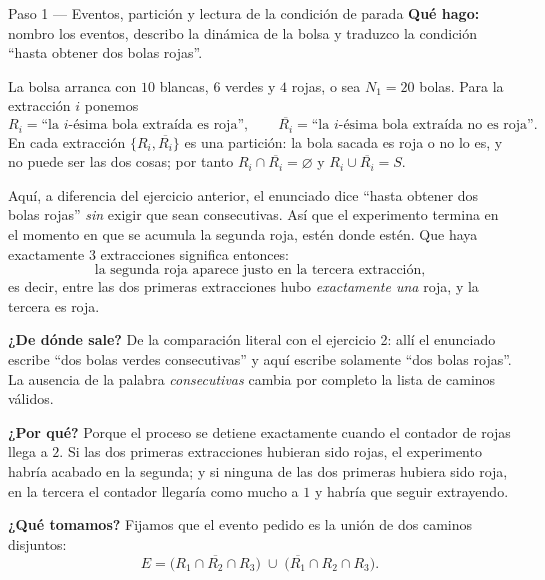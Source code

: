 \documentclass[11pt]{article}
\begin{document}
\begin{paso}{Paso 1 --- Eventos, partición y lectura de la condición de parada}
\textbf{Qué hago:} nombro los eventos, describo la dinámica de la bolsa y traduzco la condición ``hasta obtener dos bolas rojas''.

La bolsa arranca con $10$ blancas, $6$ verdes y $4$ rojas, o sea $N_1=20$ bolas. Para la extracción $i$ ponemos
\[
R_i=\text{``la $i$-ésima bola extraída es roja''},
\qquad
\overline{R_i}=\text{``la $i$-ésima bola extraída no es roja''}.
\]
En cada extracción $\{R_i,\overline{R_i}\}$ es una partición: la bola sacada es roja o no lo es, y no puede ser las dos cosas; por tanto $R_i\cap\overline{R_i}=\varnothing$ y $R_i\cup\overline{R_i}=S$.

Aquí, a diferencia del ejercicio anterior, el enunciado dice ``hasta obtener dos bolas rojas'' \emph{sin} exigir que sean consecutivas. Así que el experimento termina en el momento en que se acumula la segunda roja, estén donde estén. Que haya exactamente $3$ extracciones significa entonces:
\[
\text{la segunda roja aparece justo en la tercera extracción,}
\]
es decir, entre las dos primeras extracciones hubo \emph{exactamente una} roja, y la tercera es roja.

\textbf{¿De dónde sale?} De la comparación literal con el ejercicio 2: allí el enunciado escribe ``dos bolas verdes consecutivas'' y aquí escribe solamente ``dos bolas rojas''. La ausencia de la palabra \emph{consecutivas} cambia por completo la lista de caminos válidos.

\textbf{¿Por qué?} Porque el proceso se detiene exactamente cuando el contador de rojas llega a $2$. Si las dos primeras extracciones hubieran sido rojas, el experimento habría acabado en la segunda; y si ninguna de las dos primeras hubiera sido roja, en la tercera el contador llegaría como mucho a $1$ y habría que seguir extrayendo.

\textbf{¿Qué tomamos?} Fijamos que el evento pedido es la unión de dos caminos disjuntos:
\[
E=\bigl(R_1\cap \overline{R_2}\cap R_3\bigr)\;\cup\;\bigl(\overline{R_1}\cap R_2\cap R_3\bigr).
\]
\end{paso}
\end{document}
